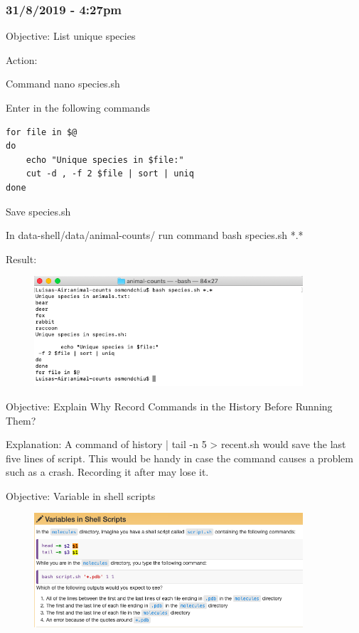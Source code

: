 \documentclass{article}
\begin{document}
\subsubsection*{31/8/2019 - 4:27pm}

Objective: List unique species

Action:

Command nano species.sh\par 
Enter in the following commands

\begin{verbatim}
for file in $@
do
	echo "Unique species in $file:"
	cut -d , -f 2 $file | sort | uniq
done \end{verbatim}
Save species.sh

In data-shell/data/animal-counts/ run command bash species.sh *.*

Result:

\begin{figure}[htp]
    \centering
    \includegraphics[width=10cm]{Screenshot20.png}
    \label{fig:ls-20}
\end{figure}

Objective: Explain Why Record Commands in the History Before Running Them?

Explanation: A command of history | tail -n 5 > recent.sh would save the last five lines of script. This would be handy in case the command causes a problem such as a crash. Recording it after may lose it.

Objective: Variable in shell scripts

\begin{figure}[htp]
    \centering
    \includegraphics[width=10cm]{Screenshot21.png}
    \label{fig:ls-21}
\end{figure}
\end{document}
